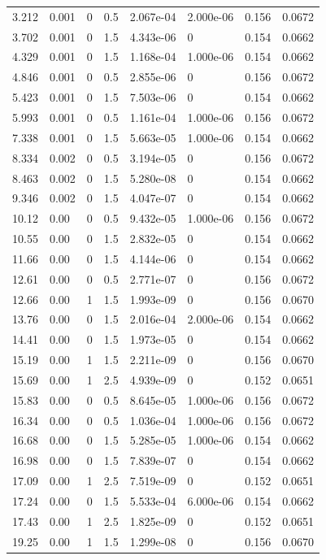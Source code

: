 \documentclass[preview]{standalone}
\begin{document}
{{\begin{tabular}{L{1.2cm}C{1.2cm} C{0.3cm}C{0.5cm} C{1.4cm}C{1.4cm} C{1.4cm}C{1.4cm}}
  3.212  &  0.001  & 0     & 0.5 &  2.067e-04  & 2.000e-06  & 0.156 &  0.0672   \\ 
  3.702  &  0.001  & 0     & 1.5 &  4.343e-06  & 0  & 0.154 &  0.0662   \\ 
  4.329  &  0.001  & 0     & 1.5 &  1.168e-04  & 1.000e-06  & 0.154 &  0.0662   \\ 
  4.846  &  0.001  & 0     & 0.5 &  2.855e-06  & 0  & 0.156 &  0.0672   \\ 
  5.423  &  0.001  & 0     & 1.5 &  7.503e-06  & 0  & 0.154 &  0.0662   \\ 
  5.993  &  0.001  & 0     & 0.5 &  1.161e-04  & 1.000e-06  & 0.156 &  0.0672   \\ 
  7.338  &  0.001  & 0     & 1.5 &  5.663e-05  & 1.000e-06  & 0.154 &  0.0662   \\ 
  8.334  &  0.002  & 0     & 0.5 &  3.194e-05  & 0  & 0.156 &  0.0672   \\ 
  8.463  &  0.002  & 0     & 1.5 &  5.280e-08  & 0  & 0.154 &  0.0662   \\ 
  9.346  &  0.002  & 0     & 1.5 &  4.047e-07  & 0  & 0.154 &  0.0662   \\ 
  10.12  &  0.00  & 0     & 0.5 &  9.432e-05  & 1.000e-06  & 0.156 &  0.0672   \\ 
  10.55  &  0.00  & 0     & 1.5 &  2.832e-05  & 0  & 0.154 &  0.0662   \\ 
  11.66  &  0.00  & 0     & 1.5 &  4.144e-06  & 0  & 0.154 &  0.0662   \\ 
  12.61  &  0.00  & 0     & 0.5 &  2.771e-07  & 0  & 0.156 &  0.0672   \\ 
  12.66  &  0.00  & 1     & 1.5 &  1.993e-09  & 0  & 0.156 &  0.0670   \\ 
  13.76  &  0.00  & 0     & 1.5 &  2.016e-04  & 2.000e-06  & 0.154 &  0.0662   \\ 
  14.41  &  0.00  & 0     & 1.5 &  1.973e-05  & 0  & 0.154 &  0.0662   \\ 
  15.19  &  0.00  & 1     & 1.5 &  2.211e-09  & 0  & 0.156 &  0.0670   \\ 
  15.69  &  0.00  & 1     & 2.5 &  4.939e-09  & 0  & 0.152 &  0.0651   \\ 
  15.83  &  0.00  & 0     & 0.5 &  8.645e-05  & 1.000e-06  & 0.156 &  0.0672   \\ 
  16.34  &  0.00  & 0     & 0.5 &  1.036e-04  & 1.000e-06  & 0.156 &  0.0672   \\ 
  16.68  &  0.00  & 0     & 1.5 &  5.285e-05  & 1.000e-06  & 0.154 &  0.0662   \\ 
  16.98  &  0.00  & 0     & 1.5 &  7.839e-07  & 0  & 0.154 &  0.0662   \\ 
  17.09  &  0.00  & 1     & 2.5 &  7.519e-09  & 0  & 0.152 &  0.0651   \\ 
  17.24  &  0.00  & 0     & 1.5 &  5.533e-04  & 6.000e-06  & 0.154 &  0.0662   \\ 
  17.43  &  0.00  & 1     & 2.5 &  1.825e-09  & 0  & 0.152 &  0.0651   \\ 
  19.25  &  0.00  & 1     & 1.5 &  1.299e-08  & 0  & 0.156 &  0.0670   \\ 
\hline 
\end{tabular} 

}}
\end{document}
